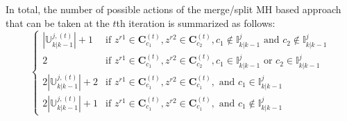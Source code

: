 In total, the number of possible actions of the merge/split MH based approach that can be taken at the $t$th iteration is summarized as follows: 
$$\begin{cases}
|\mathbb{U}^{j,(t)}_{k|k-1}| + 1 & \text{if  } z^{r1}\in\mathbf{C}_{c_1}^{(t)}, z^{r2}\in\mathbf{C}_{c_2}^{(t)}, c_1\notin\mathbb{I}^j_{k|k-1} \text{  and  } c_2\notin\mathbb{I}^j_{k|k-1}\\
2 & \text{if  } z^{r1}\in\mathbf{C}_{c_1}^{(t)}, z^{r2}\in\mathbf{C}_{c_2}^{(t)}, c_1\in\mathbb{I}^j_{k|k-1} \text{  or  } c_2\in\mathbb{I}^j_{k|k-1}\\
2|\mathbb{U}^{j,(t)}_{k|k-1}| + 2 & \text{if  } z^{r1}\in\mathbf{C}_{c_1}^{(t)}, z^{r2}\in\mathbf{C}_{c_1}^{(t)}, \text{  and  } c_1\in\mathbb{I}^j_{k|k-1}\\
2|\mathbb{U}^{j,(t)}_{k|k-1}| + 1 & \text{if  } z^{r1}\in\mathbf{C}_{c_1}^{(t)}, z^{r2}\in\mathbf{C}_{c_1}^{(t)}, \text{  and  } c_1\notin\mathbb{I}^j_{k|k-1}
\end{cases}$$

